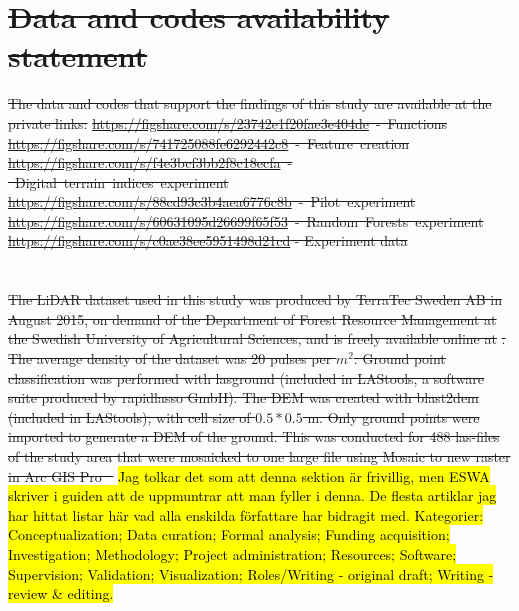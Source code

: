 \documentclass[11pt, review]{elsarticle} %
\providecommand{\DIFaddtex}[1]{{\protect\color{blue}\uwave{#1}}} %
\providecommand{\DIFdeltex}[1]{{\protect\color{red}\sout{#1}}}                      %
\providecommand{\DIFaddbegin}{} %
\providecommand{\DIFaddend}{} %
\providecommand{\DIFdelbegin}{} %
\providecommand{\DIFdelend}{} %
\providecommand{\DIFadd}[1]{\texorpdfstring{\DIFaddtex{#1}}{#1}} %
\providecommand{\DIFdel}[1]{\texorpdfstring{\DIFdeltex{#1}}{}} %
\begin{document}
\DIFdelbegin \section*{\DIFdel{Data and codes availability statement}}
\DIFdel{The data and codes that support the findings of this study are available at the private links:}%
\DIFdel{\mbox{\href{https://figshare.com/s/23742e1f20fae3e404de}{https://figshare.com/s/23742e1f20fae3e404de} - Functions\itshape\ignorespaces}
\mbox{\href{https://figshare.com/s/741725088fe6292442c8}{https://figshare.com/s/741725088fe6292442c8} - Feature creation\itshape\ignorespaces}
\mbox{\href{https://figshare.com/s/f4e3bcf3bb2f8c18ecfa}{https://figshare.com/s/f4e3bcf3bb2f8c18ecfa} - Digital terrain indices experiment\itshape\ignorespaces}
\mbox{\href{https://figshare.com/s/88cd93c3b4aea6776c8b}{https://figshare.com/s/88cd93c3b4aea6776c8b} - Pilot experiment\itshape\ignorespaces}
\mbox{\href{https://figshare.com/s/60631095d26699f65f53}{https://figshare.com/s/60631095d26699f65f53} - Random Forests experiment\itshape\ignorespaces}
\mbox{\href{https://figshare.com/s/c0ae38ee5951498d21cd}{https://figshare.com/s/c0ae38ee5951498d21cd}} - Experiment data
}\DIFdelend \DIFaddbegin \section*{\DIFadd{CRediT authorship contribution statement}}
\DIFaddend 

\DIFdelbegin %
\DIFdel{The LiDAR dataset used in this study was produced by TerraTec Sweden AB in August 2015, on demand of the Department of Forest Resource Management at the Swedish University of Agricultural Sciences, and is freely available online at }%
\DIFdel{. The average density of the dataset was 20 pulses per $m^2$.  Ground point classification was performed with lasground (included in LAStools, a software suite produced by rapidlasso GmbH). The DEM was created with blast2dem (included in LAStools),  with cell size of $0.5*0.5$ m.
Only ground points were imported  to generate a DEM of the ground. This was conducted for 488 las-files of the study area that were mosaicked to one large file using Mosaic to new raster in Arc GIS Pro \mbox{%
\citep{EsriArcGisBook}}\hspace{0pt}%
}\DIFdelend \DIFaddbegin \hl{ Jag tolkar det som att denna sektion \"ar frivillig, men ESWA skriver i guiden att de uppmuntrar att man fyller i denna. De flesta artiklar jag har hittat listar h\"ar vad alla enskilda f\"orfattare har bidragit med. Kategorier: Conceptualization; Data curation; Formal analysis; Funding acquisition; Investigation; Methodology; Project administration; Resources; Software; Supervision; Validation; Visualization; Roles/Writing - original draft; Writing - review & editing.}
\end{document}
